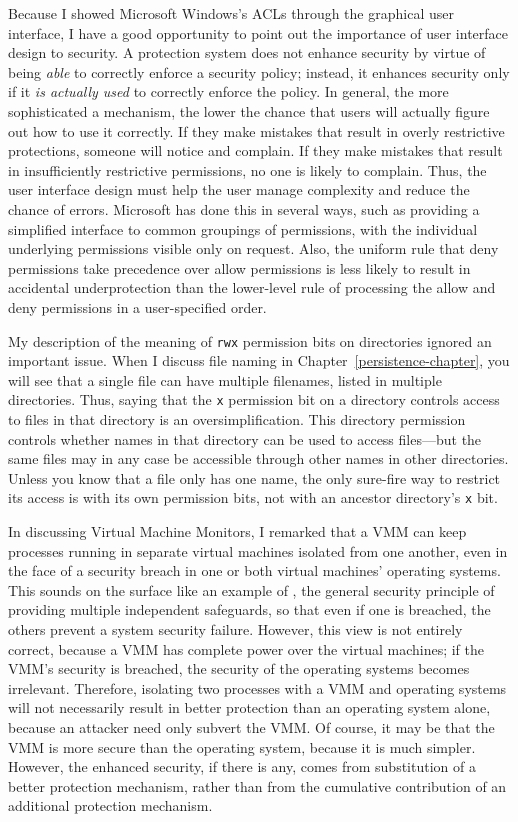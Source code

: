 Because I showed Microsoft Windows's ACLs through the graphical
user interface, I have a good opportunity to point out the importance
of user interface design to security.  A protection system does not
enhance security by virtue of being \emph{able} to correctly enforce a
security policy; instead, it enhances security only if it \emph{is
actually used} to correctly enforce the policy.  In general, the more
sophisticated a mechanism, the lower the chance that users will
actually figure out how to use it correctly.  If they make mistakes
that result in overly restrictive protections, someone will notice and
complain.  If they make mistakes that result in insufficiently
restrictive permissions, no one is likely to complain.  Thus, the user
interface design must help the user manage complexity and reduce the
chance of errors.  Microsoft has done this in several ways, such as
providing a simplified interface to common groupings of permissions,
with the individual underlying permissions visible only on request.
Also, the uniform rule that deny permissions take precedence over
allow permissions is less likely to result in accidental
underprotection than the lower-level rule of processing the
allow and deny permissions in a user-specified order.

My description of the meaning of \texttt{rwx} permission bits on directories
ignored an important issue.  When I discuss file naming in Chapter~\ref{persistence-chapter},
you will see that a single file can have multiple filenames,
listed in multiple directories.  Thus, saying that the \texttt{x} permission
bit on a directory controls access to files in that directory is an
oversimplification.  This directory permission controls whether names
in that directory can be used to access files---but the same files may
in any case be accessible through other names in other directories.
Unless you know that a file only has one name, the only sure-fire way
to restrict its access is with its own permission bits, not with an
ancestor directory's \texttt{x} bit.

In discussing Virtual
Machine Monitors, I remarked that a VMM can keep processes running in
separate virtual machines isolated from one another, even in the face
of a security breach in one or both virtual machines' operating
systems.  This sounds on the surface like an example of , the general security principle of providing multiple
independent safeguards, so that even if one is breached, the others
prevent a system security failure.  However, this view is not entirely
correct, because a VMM has complete power over the virtual machines;
if the VMM's security is breached, the security of the operating
systems becomes irrelevant.  Therefore, isolating two processes with a
VMM and operating systems will not necessarily result in better
protection than an operating system alone, because an attacker need
only subvert the VMM.  Of course, it may be that the VMM is more
secure than the operating system, because it is much simpler.
However, the enhanced security, if there is any, comes from
substitution of a better protection mechanism, rather than from the
cumulative contribution of an additional protection mechanism.

